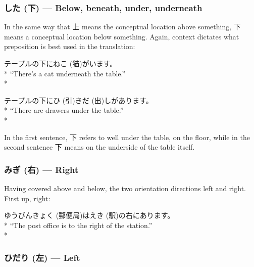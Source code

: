 \documentclass[11pt, b5paper, twoside, openright, onecolumn]{book}
\makeatletter
\newcommand*{\rubystack}[2]{{\relscale{0.5}%
  \begin{tabular}[b]{@{}c@{}}%
    {#1}\\%
   {\textscale{2}{#2}}%
  \end{tabular}}%
}
\DeclareRobustCommand*{\ruby}[2]{%
  \mbox{%
    \setlength{\parskip}{0ex}%
    \BeginAccSupp{method=pdfstringdef,ActualText={#1}}%
      \rubystack{\phantom{#2}}{#1}%
      \llap{%
        \rubystack{#2}{\phantom{#1}}%
      }%
    \EndAccSupp{}%
  }%
}
\renewcommand*{\ruby}[2]{#2 (#1)}%
\newenvironment{exampleblock}{
\setlength{\parindent}{0.6in}
\begin{minipage}[t]{\dimexpr\textwidth-\parindent}}
{\end{minipage}}
\makeatother
\begin{document}
\subsubsection{\ruby{下}{した} — Below‚ beneath‚ under‚ underneath}

In the same way that 上 means the conceptual location above something‚ 下 means a conceptual location below something. Again‚ context dictates what preposition is best used in the translation:

\vspace{0.4cm}
\begin{exampleblock}
テーブルの下に\ruby{猫}{ねこ}がいます。 \\* 
“There’s a cat underneath the table.” \\* 
\end{exampleblock}
\vspace{0.2cm}

\begin{exampleblock}
テーブルの下に\ruby{引}{ひ}き\ruby{出}{だ}しがあります。 \\* 
“There are drawers under the table.” \\* 
\end{exampleblock}
\vspace{0.2cm}

In the first sentence‚ 下 refers to well under the table‚ on the floor‚ while in the second sentence 下 means on the underside of the table itself.

\subsubsection{\ruby{右}{みぎ} — Right}

Having covered above and below‚ the two orientation directions left and right. First up‚ right:

\vspace{0.4cm}
\begin{exampleblock}
\ruby{郵便局}{ゆうびんきょく}は\ruby{駅}{えき}の右にあります。 \\* 
“The post office is to the right of the station.” \\* 
\end{exampleblock}
\subsubsection{\ruby{左}{ひだり} — Left}
\end{document}
